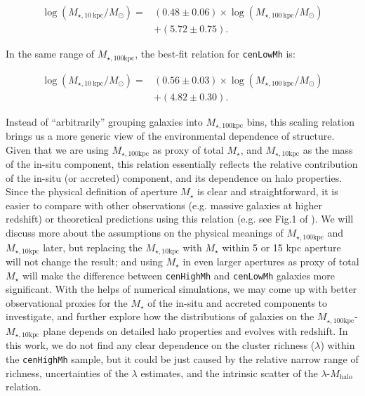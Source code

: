 \documentclass{emulateapj}
\def\rbcg{\texttt{cenHighMh}}
\def\nbcg{\texttt{cenLowMh}}
\def\mstar{{$M_{\star}$}}
\def\mhalo{{$M_{\mathrm{halo}}$}}
\def\minn{{$M_{\star,10\mathrm{kpc}}$}}
\def\mtot{{$M_{\star,100\mathrm{kpc}}$}}
\newcommand{\update}[1]{\textcolor{Bittersweet}{#1}}
\begin{document}
\begin{CJK*}{UTF8}{gbsn}
    \begin{equation}
        \begin{aligned}
        \log (M_{\star, 10\ \mathrm{kpc}}/M_{\odot}) = & (0.48\pm0.06) \times \log (M_{\star, 100\ \mathrm{kpc}}/M_{\odot}) \\ & +(5.72\pm0.75).
        \end{aligned}
    \end{equation}
    
    \noindent In the same range of \mtot{}, the best-fit relation for \nbcg{} is:
     
    \begin{equation}
        \begin{aligned}
        \log (M_{\star, 10\ \mathrm{kpc}}/M_{\odot}) = & (0.56\pm0.03) \times \log (M_{\star, 100\ \mathrm{kpc}}/M_{\odot}) \\ & +(4.82\pm0.30).
        \end{aligned}
    \end{equation}
     
    \update{ 
    Instead of ``arbitrarily'' grouping galaxies into \mtot{} bins, this scaling relation 
    brings us a more generic view of the environmental dependence of structure.
    Given that we are using \mtot{} as proxy of total \mstar{}, and \minn{} as the mass of 
    the in-situ component, this relation essentially reflects the relative contribution of
    the in-situ (or accreted) component, and its dependence on halo properties.  
    Since the physical definition of aperture \mstar{} is clear and straightforward, it is 
    easier to compare with other observations (e.g. massive galaxies at higher redshift) or  
    theoretical predictions using this relation (e.g. see Fig.1 of \citealt{Wellons2016b}). 
    We will discuss more about the assumptions on the physical meanings of \mtot{} and 
    \minn{} later, but replacing the \minn{} with \mstar{} within 5 or 15 kpc aperture 
    will not change the result; and using \mstar{} in even larger apertures as proxy of 
    total \mstar{} will make the difference between \rbcg{} and \nbcg{} galaxies more 
    significant.
    With the helps of numerical simulations, we may come up with better observational 
    proxies for the \mstar{} of the in-situ and accreted components to investigate, and 
    further explore how the distributions of galaxies on the \mtot{}-\minn{} plane depends 
    on detailed halo properties and evolves with redshift. 
    In this work, we do not find any clear dependence on the cluster richness ($\lambda$)
    within the \rbcg{} sample, but it could be just caused by the relative narrow range of 
    richness, uncertainties of the $\lambda$ estimates, and the intrinsic scatter of the 
    $\lambda$-\mhalo{} relation.  
    }    
     

\end{CJK*}
\end{document}
